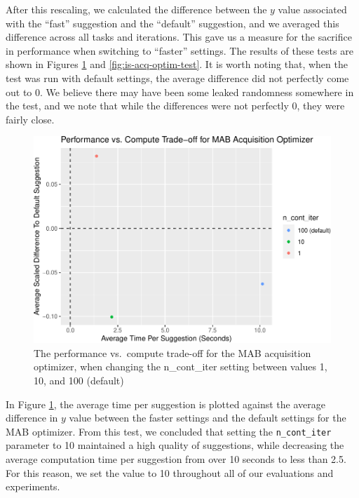 \documentclass[12pt,twoside]{reedthesis}
\begin{document}
After this rescaling, we calculated the difference between the \(y\) value associated with the ``fast'' suggestion and the ``default'' suggestion, and we averaged this difference across all tasks and iterations. This gave us a measure for the sacrifice in performance when switching to ``faster'' settings. The results of these tests are shown in Figures \ref{fig:mab-acq-optim-test} and \ref{fig:is-acq-optim-test}. It is worth noting that, when the test was run with default settings, the average difference did not perfectly come out to 0. We believe there may have been some leaked randomness somewhere in the test, and we note that while the differences were not perfectly 0, they were fairly close.
\begin{figure}
\centering
\includegraphics{thesis_files/figure-latex/mab-acq-optim-test-1.pdf}
\caption{\label{fig:mab-acq-optim-test}The performance vs.~compute trade-off for the MAB acquisition optimizer, when changing the n\_cont\_iter setting between values 1, 10, and 100 (default)}
\end{figure}
In Figure \ref{fig:mab-acq-optim-test}, the average time per suggestion is plotted against the average difference in \(y\) value between the faster settings and the default settings for the MAB optimizer. From this test, we concluded that setting the \texttt{n\_cont\_iter} parameter to 10 maintained a high quality of suggestions, while decreasing the average computation time per suggestion from over 10 seconds to less than 2.5. For this reason, we set the value to 10 throughout all of our evaluations and experiments.
\end{document}
